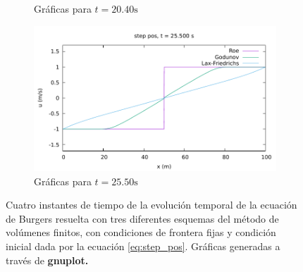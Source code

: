 \documentclass[12pt]{article}
\begin{document}
\begin{figure}[h]
\begin{subfigure}[b]{0.49\textwidth}
		\caption*{Gráficas para $t=20.40\unit{\second}$}
		\label{fig:step_pos-fija3}
	\end{subfigure}
	\vfill
	\begin{subfigure}[b]{0.49\textwidth}
		\includegraphics[width=\textwidth]{../burgers1DVF/results/sol_fijas/step_pos/850.pdf}
		\caption*{Gráficas para $t=25.50\unit{\second}$}
		\label{fig:step_pos-fija4}
	\end{subfigure}
	\caption{Cuatro instantes de tiempo de la evolución temporal de la ecuación de Burgers resuelta con tres diferentes esquemas del método de volúmenes finitos, con condiciones de frontera fijas y condición inicial dada por la ecuación \ref{eq:step_pos}. Gráficas generadas a través de \textbf{gnuplot.}}
	\label{fig:step_pos-fija}
\end{figure}
\end{document}

